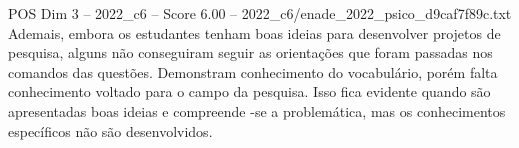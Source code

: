 \begin{textsample}{POS Dim 3 – 2022\_c6 – Score 6.00 – 2022\_c6/enade\_2022\_psico\_d9caf7f89c.txt}
Ademais, embora os estudantes tenham boas ideias para desenvolver projetos de pesquisa, alguns não conseguiram seguir as orientações que foram passadas nos comandos das questões.
Demonstram conhecimento do vocabulário, porém falta conhecimento voltado para o campo da pesquisa.
Isso fica evidente quando são apresentadas boas ideias e compreende -se a problemática, mas os conhecimentos específicos não são desenvolvidos.

\end{textsample}
